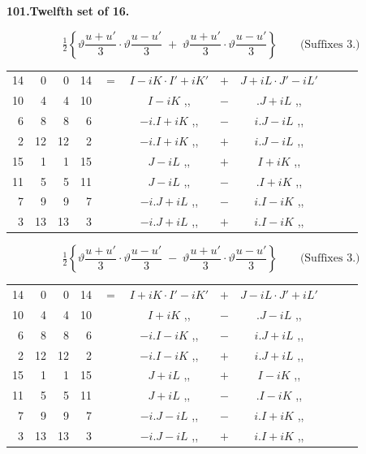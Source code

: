 \documentclass[11pt]{article}
\newcommand{\half}{\tfrac{1}{2}}
\begin{document}
\medskip
\begin{center}\textbf{101.\quad Twelfth set of 16.}\end{center}

\[
\half\!\left\{\vartheta\frac{u+u'}{3}\cdot\vartheta\frac{u-u'}{3}\;+\;\vartheta\frac{u+u'}{3}\cdot\vartheta\frac{u-u'}{3}\right\}\qquad\text{(Suffixes 3.)}
\]
{\small
\begin{center}
\begin{tabular}{rrrrr@{\ }c@{\ }lcr@{\ }c@{\ }l}
14 & 0  & 0  & 14 & $=$ & $I-iK\cdot I'+iK'$ & $+$ & $J+iL\cdot J'-iL'$ \\
10 & 4  & 4  & 10 & & $I-iK$ \quad ,, & $-$ & $.J+iL$ \quad ,, \\
6  & 8  & 8  & 6  & & $-i.I+iK$ \quad ,, & $-$ & $i.J-iL$ \quad ,, \\
2  & 12 & 12 & 2  & & $-i.I+iK$ \quad ,, & $+$ & $i.J-iL$ \quad ,, \\
15 & 1  & 1  & 15 & & $J-iL$ \quad ,, & $+$ & $I+iK$ \quad ,, \\
11 & 5  & 5  & 11 & & $J-iL$ \quad ,, & $-$ & $.I+iK$ \quad ,, \\
7  & 9  & 9  & 7  & & $-i.J+iL$ \quad ,, & $-$ & $i.I-iK$ \quad ,, \\
3  & 13 & 13 & 3  & & $-i.J+iL$ \quad ,, & $+$ & $i.I-iK$ \quad ,, \\
\end{tabular}
\end{center}
}

\[
\half\!\left\{\vartheta\frac{u+u'}{3}\cdot\vartheta\frac{u-u'}{3}\;-\;\vartheta\frac{u+u'}{3}\cdot\vartheta\frac{u-u'}{3}\right\}\qquad\text{(Suffixes 3.)}
\]
{\small
\begin{center}
\begin{tabular}{rrrrr@{\ }c@{\ }lcr@{\ }c@{\ }l}
14 & 0  & 0  & 14 & $=$ & $I+iK\cdot I'-iK'$ & $+$ & $J-iL\cdot J'+iL'$ \\
10 & 4  & 4  & 10 & & $I+iK$ \quad ,, & $-$ & $.J-iL$ \quad ,, \\
6  & 8  & 8  & 6  & & $-i.I-iK$ \quad ,, & $-$ & $i.J+iL$ \quad ,, \\
2  & 12 & 12 & 2  & & $-i.I-iK$ \quad ,, & $+$ & $i.J+iL$ \quad ,, \\
15 & 1  & 1  & 15 & & $J+iL$ \quad ,, & $+$ & $I-iK$ \quad ,, \\
11 & 5  & 5  & 11 & & $J+iL$ \quad ,, & $-$ & $.I-iK$ \quad ,, \\
7  & 9  & 9  & 7  & & $-i.J-iL$ \quad ,, & $-$ & $i.I+iK$ \quad ,, \\
3  & 13 & 13 & 3  & & $-i.J-iL$ \quad ,, & $+$ & $i.I+iK$ \quad ,, \\
\end{tabular}
\end{center}
}
\end{document}
